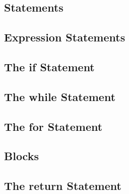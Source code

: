 \begin{homeworkProblem}
	\chapter{Statements}
	\section{Expression Statements}
	\section{The if Statement}
	\section{The while Statement}
	\section{The for Statement}
	\section{Blocks}
	\section{The return Statement}
\end{homeworkProblem}